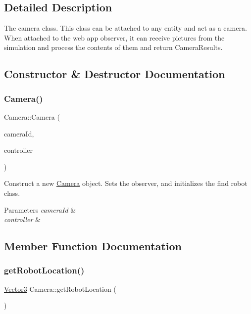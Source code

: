\subsection{Detailed Description}
The camera class. This class can be attached to any entity and act as a camera. When attached to the web app observer, it can receive pictures from the simulation and process the contents of them and return Camera\+Results. 

\subsection{Constructor \& Destructor Documentation}
\mbox{\label{classCamera_a94c943c9dbc0d75340f34d3816eec8fc}} 
\subsubsection{\texorpdfstring{Camera()}{Camera()}}
{\footnotesize\ttfamily Camera\+::\+Camera (\begin{DoxyParamCaption}\item[{int}]{camera\+Id,  }\item[{\hyperlink{classICameraController}{I\+Camera\+Controller} $\ast$}]{controller }\end{DoxyParamCaption})\hspace{0.3cm}{\ttfamily [inline]}}



Construct a new \hyperlink{classCamera}{Camera} object. Sets the observer, and initializes the find robot class. 


\begin{DoxyParams}{Parameters}
{\em camera\+Id} & \\
\hline
{\em controller} & \\
\hline
\end{DoxyParams}


\subsection{Member Function Documentation}
\mbox{\label{classCamera_a23e1dc349268eafe666b83d0a3b831a2}} 
\subsubsection{\texorpdfstring{get\+Robot\+Location()}{getRobotLocation()}}
{\footnotesize\ttfamily \hyperlink{classVector3}{Vector3} Camera\+::get\+Robot\+Location (\begin{DoxyParamCaption}{ }\end{DoxyParamCaption})}



